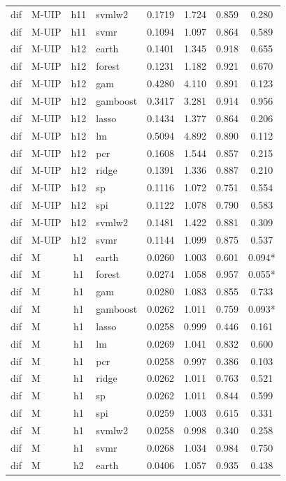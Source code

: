 \begin{ThreePartTable}
\begin{longtable}[t]{llclcccc}
dif & M-UIP & h11 & svmlw2 & 0.1719 & 1.724 & 0.859 & 0.280\\
dif & M-UIP & h11 & svmr & 0.1094 & 1.097 & 0.864 & 0.589\\
\addlinespace
dif & M-UIP & h12 & earth & 0.1401 & 1.345 & 0.918 & 0.655\\
dif & M-UIP & h12 & forest & 0.1231 & 1.182 & 0.921 & 0.670\\
dif & M-UIP & h12 & gam & 0.4280 & 4.110 & 0.891 & 0.123\\
dif & M-UIP & h12 & gamboost & 0.3417 & 3.281 & 0.914 & 0.956\\
dif & M-UIP & h12 & lasso & 0.1434 & 1.377 & 0.864 & 0.206\\
dif & M-UIP & h12 & lm & 0.5094 & 4.892 & 0.890 & 0.112\\
dif & M-UIP & h12 & pcr & 0.1608 & 1.544 & 0.857 & 0.215\\
dif & M-UIP & h12 & ridge & 0.1391 & 1.336 & 0.887 & 0.210\\
dif & M-UIP & h12 & sp & 0.1116 & 1.072 & 0.751 & 0.554\\
dif & M-UIP & h12 & spi & 0.1122 & 1.078 & 0.790 & 0.583\\
dif & M-UIP & h12 & svmlw2 & 0.1481 & 1.422 & 0.881 & 0.309\\
dif & M-UIP & h12 & svmr & 0.1144 & 1.099 & 0.875 & 0.537\\
\addlinespace
dif & M & h1 & earth & 0.0260 & 1.003 & 0.601 & 0.094*\\
dif & M & h1 & forest & 0.0274 & 1.058 & 0.957 & 0.055*\\
dif & M & h1 & gam & 0.0280 & 1.083 & 0.855 & 0.733\\
dif & M & h1 & gamboost & 0.0262 & 1.011 & 0.759 & 0.093*\\
dif & M & h1 & lasso & 0.0258 & 0.999 & 0.446 & 0.161\\
dif & M & h1 & lm & 0.0269 & 1.041 & 0.832 & 0.600\\
dif & M & h1 & pcr & 0.0258 & 0.997 & 0.386 & 0.103\\
dif & M & h1 & ridge & 0.0262 & 1.011 & 0.763 & 0.521\\
dif & M & h1 & sp & 0.0262 & 1.011 & 0.844 & 0.599\\
dif & M & h1 & spi & 0.0259 & 1.003 & 0.615 & 0.331\\
dif & M & h1 & svmlw2 & 0.0258 & 0.998 & 0.340 & 0.258\\
dif & M & h1 & svmr & 0.0268 & 1.034 & 0.984 & 0.750\\
\addlinespace
dif & M & h2 & earth & 0.0406 & 1.057 & 0.935 & 0.438\\

\end{longtable}
\end{ThreePartTable}
